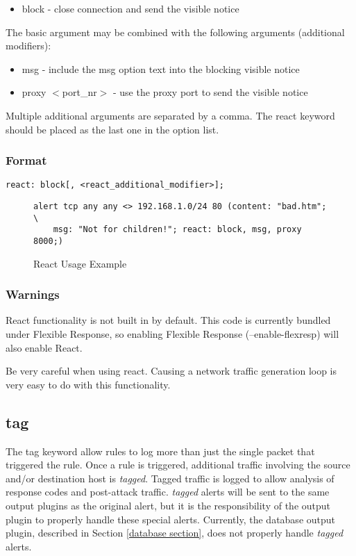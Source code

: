 \documentclass[english]{report}
\begin{document}
\begin{itemize}
\item block - close connection and send the visible notice 
\end{itemize}
The basic argument may be combined with the following arguments (additional
modifiers): 

\begin{itemize}
\item msg - include the msg option text into the blocking visible notice 
\item proxy $<$port\_nr$>$ - use the proxy port to send the visible notice
\end{itemize}
Multiple additional arguments are separated by a comma. The react
keyword should be placed as the last one in the option list.


\subsubsection{Format}

\begin{verbatim}
react: block[, <react_additional_modifier>];
\end{verbatim}
%
\begin{figure}[!hbpt]
\begin{verbatim}
alert tcp any any <> 192.168.1.0/24 80 (content: "bad.htm"; \
    msg: "Not for children!"; react: block, msg, proxy 8000;) 
\end{verbatim}
\caption{\label{react examples}React Usage Example}
\end{figure}

\subsubsection{Warnings}

React functionality is not built in by default.  This code is currently bundled
under Flexible Response, so enabling Flexible Response (--enable-flexresp)
will also enable React.  

Be very careful when using react.  Causing a network traffic generation
loop is very easy to do with this functionality.


\subsection{tag \label{tag section}}

The tag keyword allow rules to log more than just the single packet that
triggered the rule. Once a rule is triggered, additional traffic involving the
source and/or destination host is \emph{tagged}. Tagged traffic is logged to
allow analysis of response codes and post-attack traffic.  \emph{tagged} alerts
will be sent to the same output plugins as the original alert, but it is the
responsibility of the output plugin to properly handle these special alerts.
Currently, the database output plugin, described in Section \ref{database 
section}, does not properly handle \emph{tagged} alerts.
\end{document}
